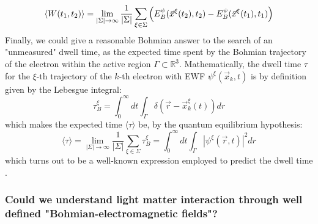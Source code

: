 \documentclass[11pt, a4paper]{article} %
\newcommand{\R}{\mathbb{R}} %
\begin{document}
\begin{equation}
\langle W(t_1,t_2)\rangle = \lim_{|\Sigma|\rightarrow \infty}\frac{1}{|\Sigma|} \sum_{\xi\in\Sigma} \qty(E^\psi_B(\vec{x}^\xi(t_2),t_2)-E^\psi_B(\vec{x}^\xi(t_1),t_1))
\end{equation}
Finally, we could give a reasonable Bohmian answer to the search of an "unmeasured" dwell time, as the expected time spent by the Bohmian trajectory of the electron within the active region $\Gamma\subset \R^3$. Mathematically, the dwell time $\tau$ for the $\xi$-th trajectory of the $k$-th electron with EWF $\psi^\xi(\vec{x}_k,t)$ is by definition given by the Lebesgue integral:
\begin{equation}
\tau^\xi_B= \int_{0}^\infty  dt \int_\Gamma \delta(\vec{r}-\vec{x}_k^\xi(t)) dr
\end{equation}
which makes the expected time $\langle \tau\rangle$ be, by the quantum equilibrium hypothesis:
\begin{equation}
\langle \tau \rangle = \lim_{|\Sigma|\rightarrow \infty}\frac{1}{|\Sigma|} \sum_{\xi\in\Sigma} \tau_B^\xi = \int_{0}^\infty dt \int_\Gamma |\psi^\xi(\vec{r},t)|^2dr
\end{equation}
which turns out to be a well-known expression employed to predict the dwell time \cite{Tal}.

\subsubsection*{Could we understand light matter interaction through well defined "Bohmian-electromagnetic fields"?}
\end{document}
